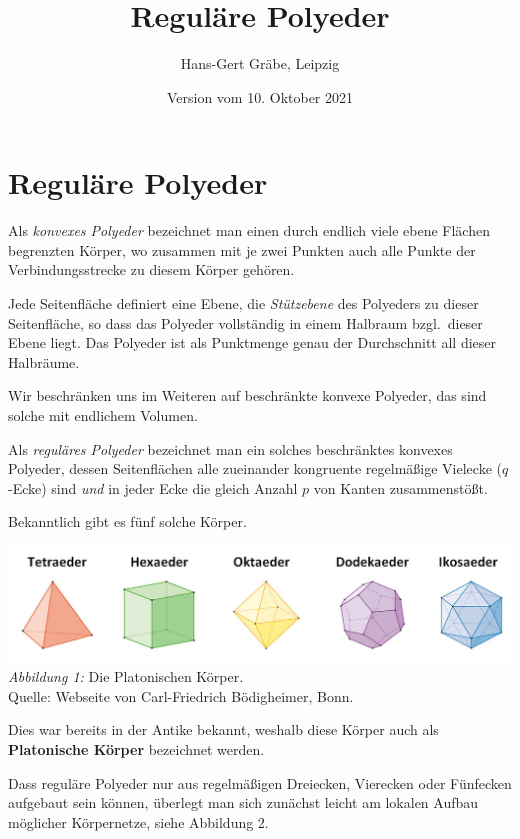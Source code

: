 \documentclass[11pt]{article}
\author{Hans-Gert Gräbe, Leipzig}
\title{Reguläre Polyeder\kosemnetlicensemark}
\date{Version vom 10. Oktober 2021}
\begin{document}
\maketitle

\section*{Reguläre Polyeder}

Als \emph{konvexes Polyeder} bezeichnet man einen durch endlich viele ebene
Flä\-chen begrenzten Körper, wo zusammen mit je zwei Punkten auch alle Punkte
der Verbindungsstrecke zu diesem Körper gehören.

Jede Seitenfläche definiert eine Ebene, die \emph{Stützebene} des Polyeders zu
dieser Seitenfläche, so dass das Polyeder vollständig in einem Halbraum
bzgl.\ dieser Ebene liegt. Das Polyeder ist als Punktmenge genau der
Durchschnitt all dieser Halbräume. 

Wir beschränken uns im Weiteren auf beschränkte konvexe Polyeder, das sind
solche mit endlichem Volumen. 

Als \emph{reguläres Polyeder} bezeichnet man ein solches beschränktes konvexes
Polyeder, dessen Seitenflächen alle zueinander kongruente regelmäßige Vielecke
($q$-Ecke) sind \emph{und} in jeder Ecke die gleich Anzahl $p$ von Kanten
zusammenstößt.

Bekanntlich gibt es fünf solche Körper.
\begin{center}
  \includegraphics[width=.8\textwidth]{graebe-05-1/PlatonischeKoerper.jpg}\\
  \emph{Abbildung 1:} Die Platonischen Körper.\\ Quelle: Webseite von
  Carl-Friedrich Bödigheimer, Bonn. 
\end{center}
Dies war bereits in der Antike bekannt, weshalb diese Körper auch als
\textbf{Platonische Körper} bezeichnet werden.  

Dass reguläre Polyeder nur aus regelmäßigen Dreiecken, Vierecken oder
Fünfecken aufgebaut sein können, überlegt man sich zunächst leicht am lokalen
Aufbau möglicher Körpernetze, siehe Abbildung 2.
\end{document}
